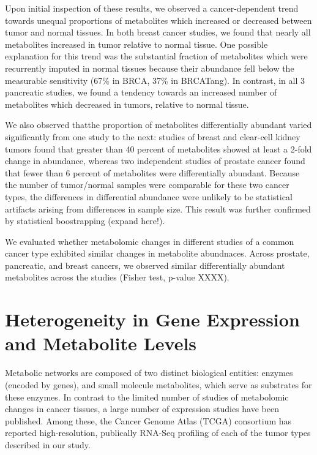 \documentclass[10pt]{article}
\begin{document}
Upon initial inspection of these results, we observed a cancer-dependent trend towards unequal proportions of metabolites which increased or decreased between tumor and normal tissues. In both breast cancer studies, we found that nearly all metabolites increased in tumor relative to normal tissue. One possible explanation for this trend was the substantial fraction of metabolites which were recurrently imputed in normal tissues because their abundance fell below the measurable sensitivity (67\% in BRCA, 37\% in BRCATang). In contrast, in all 3 pancreatic studies, we found a tendency towards an increased number of metabolites which decreased in tumors, relative to normal tissue. 

We also observed thatthe proportion of metabolites differentially abundant varied significantly from one study to the next: studies of breast and clear-cell kidney tumors found that greater than 40 percent of metabolites showed at least a 2-fold change in abundance, whereas two independent studies of prostate cancer found that fewer than 6 percent of metabolites were differentially abundant. Because the number of tumor/normal samples were comparable for these two cancer types, the differences in differential abundance were unlikely to be statistical artifacts arising from differences in sample size. This result was further confirmed by statistical boostrapping (expand here!).

We evaluated whether metabolomic changes in different studies of a common cancer type exhibited similar changes in metabolite abundnaces. Across prostate, pancreatic, and breast cancers, we observed similar differentially abundant metabolites across the studies (Fisher test, p-value XXXX).



\section{Heterogeneity in Gene Expression and Metabolite Levels}

Metabolic networks are composed of two distinct biological entities: enzymes (encoded by genes), and small molecule metabolites, which serve as substrates for these enzymes. In contrast to the limited number of studies of metabolomic changes in cancer tissues, a large number of expression studies have been published. Among these, the Cancer Genome Atlas (TCGA) consortium has reported high-resolution, publically RNA-Seq profiling of each of the tumor types described in our study. 
\end{document}
